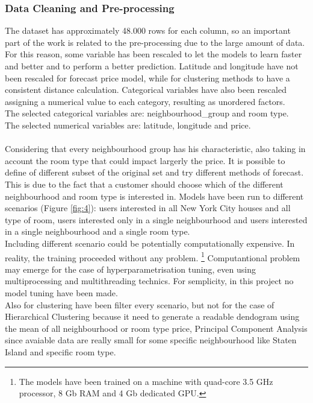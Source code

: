 \documentclass{FR16}
\begin{document}
\newpage

\subsubsection{Data Cleaning and Pre-processing}

The dataset has approximately 48.000 rows for each column, so an important part of the work is related to the pre-processing due to the large amount of data. For this reason, some variable has been rescaled to let the models to learn faster and better and to perform a better prediction. Latitude and longitude have not been rescaled for forecast price model, while for clustering methods to have a consistent distance calculation. Categorical variables have also been rescaled assigning a numerical value to each category, resulting as unordered factors.\\
The selected categorical variables are: neighbourhood\_group and room type.\\
The selected numerical variables are: latitude, longitude and price.
\\\\
Considering that every neighbourhood group has his characteristic, also taking in account the room type that could impact largerly the price. It is possible to define of different subset of the original set and try different methods of forecast. This is due to the fact that a customer should choose which of the different neighbourhood and room type is interested in. Models have been run to different scenarios (Figure \ref{fig:4}): users interested in all New York City houses and all type of room, users interested only in a single neighbourhood and users interested in a single neighbourhood and a single room type. 
\\ Including different scenario could be potentially computationally expensive. In reality, the training proceeded without any problem. \footnote{ The models have been trained on a machine with quad-core 3.5 GHz processor, 8 Gb RAM and 4 Gb dedicated GPU.} Computantional problem may emerge for the case of hyperparametrisation tuning, even using multiprocessing and multithreading technics. For semplicity, in this project no model tuning have been made. \\
Also for clustering have been filter every scenario, but not for the case of Hierarchical Clustering because it need to generate a readable dendogram using the mean of all neighbourhood or room type price, Principal Component Analysis since avaiable data are really small for some specific neighbourhood like Staten Island and specific room type.
\end{document}
